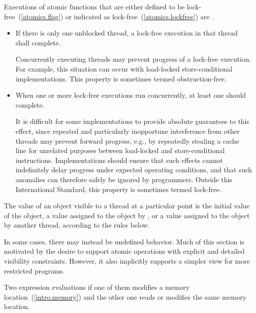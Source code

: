 \pnum
Executions of atomic functions
that are either defined to be lock-free~(\ref{atomics.flag})
or indicated as lock-free~(\ref{atomics.lockfree})
are .
\begin{itemize}
\item
  If there is only one unblocked thread,
  a lock-free execution in that thread shall complete.
  \begin{note}
    Concurrently executing threads
    may prevent progress of a lock-free execution.
    For example,
    this situation can occur
    with load-locked store-conditional implementations.
    This property is sometimes termed obstruction-free.
  \end{note}
\item
  When one or more lock-free executions run concurrently,
  at least one should complete.
  \begin{note}
    It is difficult for some implementations
    to provide absolute guarantees to this effect,
    since repeated and particularly inopportune interference
    from other threads
    may prevent forward progress,
    e.g.,
    by repeatedly stealing a cache line
    for unrelated purposes
    between load-locked and store-conditional instructions.
    Implementations should ensure
    that such effects cannot indefinitely delay progress
    under expected operating conditions,
    and that such anomalies
    can therefore safely be ignored by programmers.
    Outside this International Standard,
    this property is sometimes termed lock-free.
  \end{note}
\end{itemize}

\pnum
The value of an object visible to a thread  at a particular point is the
initial value of the object, a value assigned to the object by , or a
value assigned to the object by another thread, according to the rules below.
\begin{note} In some cases, there may instead be undefined behavior. Much of this
section is motivated by the desire to support atomic operations with explicit
and detailed visibility constraints. However, it also implicitly supports a
simpler view for more restricted programs. \end{note}

\pnum
Two expression evaluations  if one of them modifies a memory
location~(\ref{intro.memory}) and the other one reads or modifies the same
memory location.

